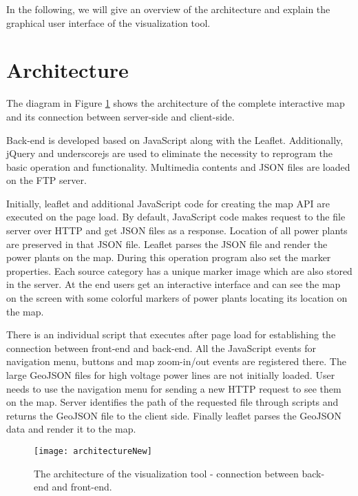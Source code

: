 In the following, we will give an overview of the architecture and explain the graphical user interface of the visualization tool.

\section{Architecture}
\label{sec:architecture}

The diagram in Figure \ref{fig:architecture} shows the architecture of the complete interactive map and its connection between server-side and client-side. 

Back-end is developed based on JavaScript along with the Leaflet. Additionally, jQuery and underscorejs are used to eliminate the necessity to reprogram the basic operation and functionality. Multimedia contents and JSON files are loaded on the FTP server. 

Initially, leaflet and additional JavaScript code for creating the map API are executed on the page load. By default, JavaScript code makes request to the file server over HTTP and get JSON files as a response. Location of all power plants are preserved in that JSON file. Leaflet parses the JSON file and render the power plants on the map. During this operation program also set the marker properties. Each source category has a unique marker image which are also stored in the server. At the end users get an interactive interface and can see the map on the screen with some colorful markers of power plants locating its location on the map. 

There is an individual script that executes after page load for establishing the connection between front-end and back-end. All the JavaScript events for navigation menu, buttons and map zoom-in/out events are registered there. The large GeoJSON files for high voltage power lines are not initially loaded. User needs to use the navigation menu for sending a new HTTP request to see them on the map. Server identifies the path of the requested file through scripts and returns the GeoJSON file to the client side. Finally leaflet parses the GeoJSON data and render it to the map.


\begin{figure}
  \begin{center}
    \texttt{[image: architectureNew]}
    \caption[The architecture of the visualization tool]{The architecture of the visualization tool - connection between back-end and front-end.}
    \label{fig:architecture}
  \end{center}
\end{figure} 

